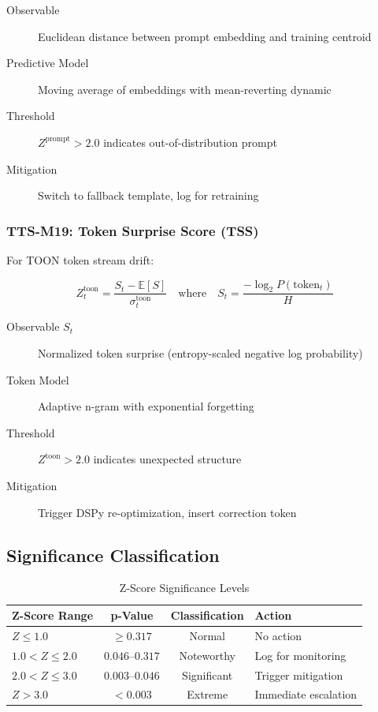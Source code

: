 \begin{description}
  \item[Observable] Euclidean distance between prompt embedding and training centroid
  \item[Predictive Model] Moving average of embeddings with mean-reverting dynamic
  \item[Threshold] $Z^{\text{prompt}} > 2.0$ indicates out-of-distribution prompt
  \item[Mitigation] Switch to fallback template, log for retraining
\end{description}

\subsubsection{TTS-M19: Token Surprise Score (TSS)}

For TOON token stream drift:

\begin{equation}
\boxed{
Z_t^{\text{toon}} = \frac{S_t - \mathbb{E}[S]}{\sigma_t^{\text{toon}}}
\quad \text{where} \quad
S_t = \frac{-\log_2 P(\text{token}_t)}{H}
}
\end{equation}

\begin{description}
  \item[Observable $S_t$] Normalized token surprise (entropy-scaled negative log probability)
  \item[Token Model] Adaptive n-gram with exponential forgetting
  \item[Threshold] $Z^{\text{toon}} > 2.0$ indicates unexpected structure
  \item[Mitigation] Trigger DSPy re-optimization, insert correction token
\end{description}

\subsection{Significance Classification}

\begin{table}[htbp]
\centering
\caption{Z-Score Significance Levels}
\label{tab:z-significance}
\begin{tabular}{l c c l}
\toprule
\textbf{Z-Score Range} & \textbf{p-Value} & \textbf{Classification} & \textbf{Action} \\
\midrule
$Z \leq 1.0$ & $\geq 0.317$ & Normal & No action \\
$1.0 < Z \leq 2.0$ & $0.046$--$0.317$ & Noteworthy & Log for monitoring \\
$2.0 < Z \leq 3.0$ & $0.003$--$0.046$ & Significant & Trigger mitigation \\
$Z > 3.0$ & $< 0.003$ & Extreme & Immediate escalation \\
\bottomrule
\end{tabular}
\end{table}

